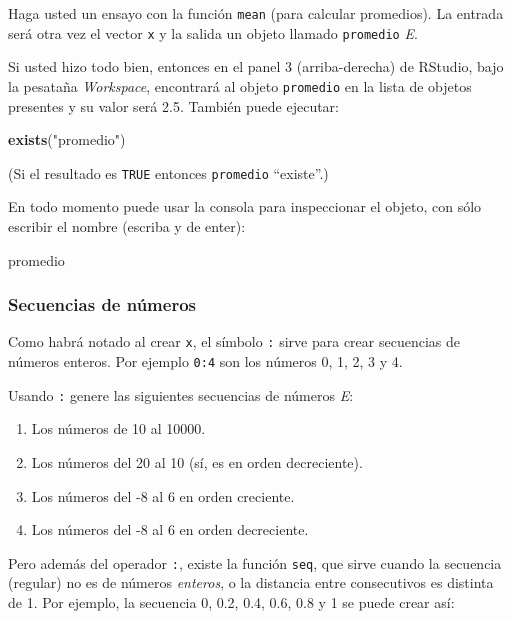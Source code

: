 \documentclass[]{article}
\newenvironment{Shaded}{}{}
\newcommand{\KeywordTok}[1]{\textcolor[rgb]{0.00,0.44,0.13}{\textbf{{#1}}}}
\newcommand{\StringTok}[1]{\textcolor[rgb]{0.25,0.44,0.63}{{#1}}}
\newcommand{\NormalTok}[1]{{#1}}
\begin{document}
Haga usted un ensayo con la función \texttt{mean} (para calcular
promedios). La entrada será otra vez el vector \texttt{x} y la salida un
objeto llamado \texttt{promedio} \emph{E}.

Si usted hizo todo bien, entonces en el panel 3 (arriba-derecha) de
RStudio, bajo la pesataña \emph{Workspace}, encontrará al objeto
\texttt{promedio} en la lista de objetos presentes y su valor será 2.5.
También puede ejecutar:

\begin{Shaded}
\begin{Highlighting}[]
\KeywordTok{exists}\NormalTok{(}\StringTok{"promedio"}\NormalTok{)}
\end{Highlighting}
\end{Shaded}
(Si el resultado es \texttt{TRUE} entonces \texttt{promedio}
``existe''.)

En todo momento puede usar la consola para inspeccionar el objeto, con
sólo escribir el nombre (escriba y de enter):

\begin{Shaded}
\begin{Highlighting}[]
\NormalTok{promedio}
\end{Highlighting}
\end{Shaded}
\subsubsection{Secuencias de números}

Como habrá notado al crear \texttt{x}, el símbolo \texttt{:} sirve para
crear secuencias de números enteros. Por ejemplo \texttt{0:4} son los
números 0, 1, 2, 3 y 4.

Usando \texttt{:} genere las siguientes secuencias de números \emph{E}:

\begin{enumerate}[1.]
\item
  Los números de 10 al 10000.
\item
  Los números del 20 al 10 (sí, es en orden decreciente).
\item
  Los números del -8 al 6 en orden creciente.
\item
  Los números del -8 al 6 en orden decreciente.
\end{enumerate}
Pero además del operador \texttt{:}, existe la función \texttt{seq}, que
sirve cuando la secuencia (regular) no es de números \emph{enteros}, o
la distancia entre consecutivos es distinta de 1. Por ejemplo, la
secuencia 0, 0.2, 0.4, 0.6, 0.8 y 1 se puede crear así:
\end{document}
